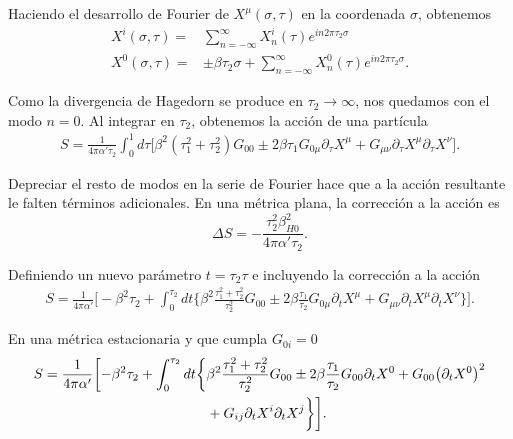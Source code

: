 Haciendo el desarrollo de Fourier de $X^\mu(\sigma,\tau)$ en la coordenada $\sigma$, obtenemos
\begin{equation}
  \begin{aligned}
    X^i(\sigma,\tau) =& \sum_{n=-\infty}^\infty X_n^i(\tau) e^{in2\pi \tau_2 \sigma} \\
    X^0(\sigma,\tau) =& \pm \beta \tau_2 \sigma +  \sum_{n=-\infty}^\infty X_n^0(\tau) e^{in2\pi \tau_2 \sigma}.
  \end{aligned}
\end{equation}

Como la divergencia de Hagedorn se produce en $\tau_2\to\infty$, nos quedamos con el modo $n=0$.
Al integrar en $\tau_2$, obtenemos la acción de una partícula
\begin{equation}
  \begin{aligned}
    S=\frac{1}{4\pi\alpha'\tau_2}\int_0^1 d\tau \big[
      \beta^2 (\tau_1^2+\tau_2^2)G_{00} \pm 2\beta\tau_1 G_{0\mu}\partial_\tau X^\mu  +G_{\mu\nu} \partial_\tau X^\mu \partial_\tau X^\nu
    \big].
  \end{aligned}
\end{equation}

Depreciar el resto de modos en la serie de Fourier hace que a la acción resultante le falten
términos adicionales. 
En una métrica plana, la corrección a la acción es
\begin{equation}
  \Delta S = - \frac{\tau_2^2 \beta^2_{H0}}{4\pi\alpha' \tau_2}.
\end{equation}

Definiendo un nuevo parámetro $t=\tau_2 \tau$ e incluyendo la corrección a la acción
\begin{equation}
  \begin{aligned}
    S=\frac{1}{4\pi\alpha'}\biggl[ -\beta^2\tau_2 + \int_0^{\tau_2} dt \biggl\{
      \beta^2 \frac{\tau_1^2+\tau_2^2}{\tau_2^2}G_{00} \pm 2\beta\frac{\tau_1}{\tau_2} G_{0\mu}\partial_t X^\mu  +G_{\mu\nu} \partial_t X^\mu \partial_t X^\nu
    \biggl\}\biggl].
  \end{aligned}
\end{equation}

En una métrica estacionaria y que cumpla $G_{0i}=0$
\begin{equation}
  \begin{aligned}
    S=\frac{1}{4\pi\alpha'}\biggl[ -\beta^2\tau_2 + \int_0^{\tau_2} dt \biggl\{&
      \beta^2 \frac{\tau_1^2+\tau_2^2}{\tau_2^2}G_{00} \pm 2\beta\frac{\tau_1}{\tau_2} G_{00}\partial_t X^0  +G_{00} \qty(\partial_t X^0)^2 \\
    &+G_{ij} \partial_t X^i \partial_t X^j
    \biggl\}\biggl].
  \end{aligned}
\end{equation}


